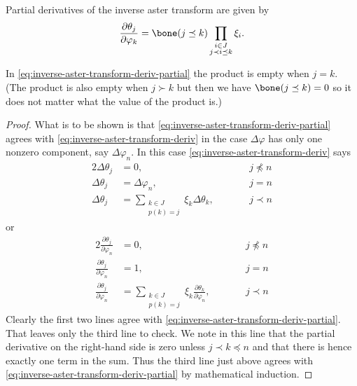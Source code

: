 \begin{theorem} \label{th:inverse-aster-transform-deriv-partial}
Partial derivatives of the inverse aster transform are given by
\begin{equation} \label{eq:inverse-aster-transform-deriv-partial}
   \frac{\partial \theta_j}{\partial \varphi_k}
   =
   \bone(j \preceq k)
   \prod_{\substack{i \in J \\ j \prec i \preceq k}} \xi_i.
\end{equation}
\end{theorem}
In \eqref{eq:inverse-aster-transform-deriv-partial} the product is empty
when $j = k$.
(The product is also empty when $j \succ k$ but then we have 
$\bone(j \preceq k) = 0$ so it does not matter what the value of the product
is.)
\begin{proof}
What is to be shown is that \eqref{eq:inverse-aster-transform-deriv-partial}
agrees with \eqref{eq:inverse-aster-transform-deriv} in the case
$\Delta \varphi$ has only one nonzero component, say $\Delta \varphi_n$.
In this case \eqref{eq:inverse-aster-transform-deriv} says
\begin{alignat*}{2}
   \Delta \theta_j & = 0, & \qquad & j \not\preceq n
   \\
   \Delta \theta_j
   & =
   \Delta \varphi_n, & & j = n
   \\
   \Delta \theta_j
   & =
   \sum_{\substack{k \in J \\ p(k) = j}} \xi_k \Delta \theta_k,
   & & j \prec n
\end{alignat*}
or
\begin{alignat*}{2}
   \frac{\partial \theta_j}{\partial \varphi_n} & = 0,
   & \qquad & j \not\preceq n
   \\
   \frac{\partial \theta_j}{\partial \varphi_n} & = 1, & & j = n
   \\
   \frac{\partial \theta_j}{\partial \varphi_n}
   & =
   \sum_{\substack{k \in J \\ p(k) = j}} \xi_k 
   \frac{\partial \theta_k}{\partial \varphi_n},
   & & j \prec n
\end{alignat*}
Clearly the first two lines agree with
\eqref{eq:inverse-aster-transform-deriv-partial}.
That leaves only the third line to check.
We note in this line that the partial derivative on the right-hand side
is zero unless $j \prec k \preceq n$ and that there is hence exactly one
term in the sum.
Thus the third line just above agrees with
\eqref{eq:inverse-aster-transform-deriv-partial} by mathematical induction.
\end{proof}

